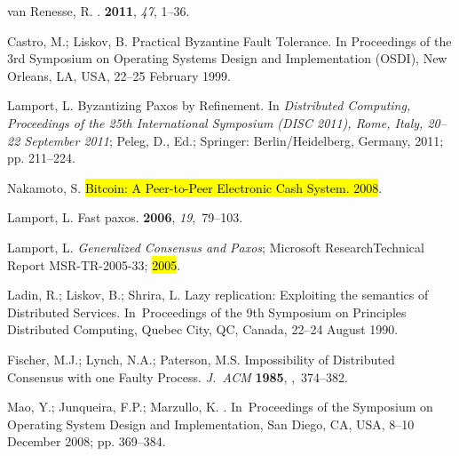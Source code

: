 \documentclass[algorithms,article,accept,moreauthors,pdftex,10pt,a4paper]{Definitions/mdpi}
\begin{document}
\begin{thebibliography}{999}
van Renesse, R.
.
 {\bf 2011}, {\em 47}, 1--36.

Castro, M.; Liskov, B.
\newblock Practical Byzantine Fault Tolerance.
\newblock In Proceedings of the 3rd Symposium on Operating Systems Design and Implementation
(OSDI), New Orleans, LA, USA, 22--25 February 1999.

Lamport, L. Byzantizing Paxos by Refinement.
\newblock In {\em Distributed Computing, Proceedings of the 25th International Symposium (DISC
2011), Rome, Italy, 20--22 September 2011}; Peleg, D., Ed.;
Springer: Berlin/Heidelberg, Germany, 2011; pp. 211--224.

Nakamoto, S.
\newblock \hl{Bitcoin: A Peer-to-Peer Electronic Cash System. 2008}. %

Lamport, L.
\newblock Fast paxos.
 {\bf 2006}, {\em 19},~79--103.

Lamport, L.
\newblock \emph{Generalized Consensus and Paxos};
\newblock Microsoft ResearchTechnical Report MSR-TR-2005-33; \hl{2005}. %

Ladin, R.; Liskov, B.; Shrira, L.
\newblock Lazy replication: Exploiting the semantics of Distributed Services.
\newblock In~Proceedings of the 9th Symposium on Principles Distributed Computing, Quebec City, QC, Canada, 22--24 August 1990.


Fischer, M.J.; Lynch, N.A.; Paterson, M.S.
\newblock Impossibility of Distributed Consensus with one Faulty Process. \emph{J.~ACM}  {\bf
1985},
,~374--382.

Mao, Y.; Junqueira, F.P.; Marzullo, K.
.
\newblock In~Proceedings of the Symposium on Operating System Design and
Implementation, San Diego, CA, USA, 8--10 December 2008; pp. 369--384.


\end{thebibliography}
\end{document}

